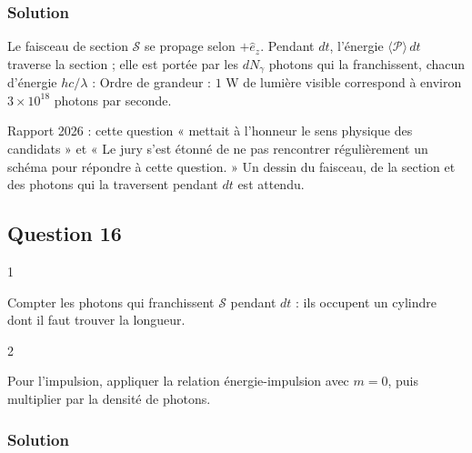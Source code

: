 \documentclass[11pt,a4paper]{article}
\newcommand{\equationajustee}[1]{%
  \sbox{\boiteequation}{$\displaystyle #1$}%
  \ifdim\wd\boiteequation>\linewidth
    \[\resizebox{\linewidth}{!}{\usebox{\boiteequation}}\]%
  \else
    \[#1\]%
  \fi}
\begin{document}
\hypertarget{solution-14}{%
\subsubsection{Solution}\label{solution-14}}

Le faisceau de section \(\mathscr S\) se propage selon \(+\hat e_z\). Pendant \(dt\), l'énergie \(\langle\mathcal P\rangle\,dt\) traverse la section ; elle est portée par les \(dN_\gamma\) photons qui la franchissent, chacun d'énergie \(hc/\lambda\) :
\equationajustee{\langle\mathcal P\rangle=\frac{dN_\gamma}{dt}\,\frac{hc}{\lambda}}
\equationajustee{\boxed{\frac{dN_\gamma}{dt}=\frac{\langle\mathcal P\rangle\,\lambda}{h\,c}}}
Ordre de grandeur : \(1\) W de lumière visible correspond à environ \(3\times10^{18}\) photons par seconde.

\begin{jury}

Rapport 2026 : cette question « mettait à l'honneur le sens physique des candidats » et « Le jury s'est étonné de ne pas rencontrer régulièrement un schéma pour répondre à cette question. » Un dessin du faisceau, de la section et des photons qui la traversent pendant \(dt\) est attendu.

\end{jury}

\hypertarget{question-16}{%
\subsection{Question 16}\label{question-16}}

\begin{indication}{1}

Compter les photons qui franchissent \(\mathscr S\) pendant \(dt\) : ils occupent un cylindre dont il faut trouver la longueur.

\end{indication}

\begin{indication}{2}

Pour l'impulsion, appliquer la relation énergie-impulsion avec \(m=0\), puis multiplier par la densité de photons.

\end{indication}

\hypertarget{solution-15}{%
\subsubsection{Solution}\label{solution-15}}
\end{document}
